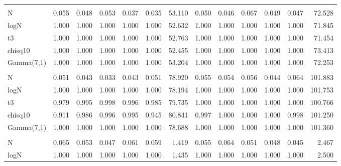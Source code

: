 \begin{table}[!h]
{\begin{tabular}[t]{lrrrrrrrrrrrr}
\addlinespace[0.3em]
\multicolumn{13}{l}{\textbf{Bootstrap Lobato}}\\
\hspace{1em}N & 0.055 & 0.048 & 0.053 & 0.037 & 0.035 & 53.110 & 0.050 & 0.046 & 0.067 & 0.049 & 0.047 & 72.528\\
\hspace{1em}logN & 1.000 & 1.000 & 1.000 & 1.000 & 1.000 & 52.632 & 1.000 & 1.000 & 1.000 & 1.000 & 1.000 & 71.845\\
\hspace{1em}t3 & 1.000 & 1.000 & 1.000 & 1.000 & 1.000 & 52.763 & 1.000 & 1.000 & 1.000 & 1.000 & 1.000 & 71.454\\
\hspace{1em}chisq10 & 1.000 & 1.000 & 1.000 & 1.000 & 1.000 & 52.455 & 1.000 & 1.000 & 1.000 & 1.000 & 1.000 & 73.413\\
\hspace{1em}Gamma(7,1) & 1.000 & 1.000 & 1.000 & 1.000 & 1.000 & 53.204 & 1.000 & 1.000 & 1.000 & 1.000 & 1.000 & 72.253\\
\addlinespace[0.3em]
\multicolumn{13}{l}{\textbf{Bootstrap Epps}}\\
\hspace{1em}N & 0.051 & 0.043 & 0.033 & 0.043 & 0.051 & 78.920 & 0.055 & 0.054 & 0.056 & 0.044 & 0.064 & 101.883\\
\hspace{1em}logN & 1.000 & 1.000 & 1.000 & 1.000 & 1.000 & 78.194 & 1.000 & 1.000 & 1.000 & 1.000 & 1.000 & 101.753\\
\hspace{1em}t3 & 0.979 & 0.995 & 0.998 & 0.996 & 0.985 & 79.735 & 1.000 & 1.000 & 1.000 & 1.000 & 1.000 & 100.766\\
\hspace{1em}chisq10 & 0.911 & 0.986 & 0.996 & 0.995 & 0.945 & 80.841 & 0.997 & 1.000 & 1.000 & 1.000 & 0.998 & 101.250\\
\hspace{1em}Gamma(7,1) & 1.000 & 1.000 & 1.000 & 1.000 & 1.000 & 78.688 & 1.000 & 1.000 & 1.000 & 1.000 & 1.000 & 101.360\\
\addlinespace[0.3em]
\multicolumn{13}{l}{\textbf{El Bouch}}\\
\hspace{1em}N & 0.065 & 0.053 & 0.047 & 0.061 & 0.059 & 1.419 & 0.055 & 0.064 & 0.051 & 0.048 & 0.045 & 2.467\\
\hspace{1em}logN & 1.000 & 1.000 & 1.000 & 1.000 & 1.000 & 1.435 & 1.000 & 1.000 & 1.000 & 1.000 & 1.000 & 2.500\\

\end{tabular}}
\end{table}

